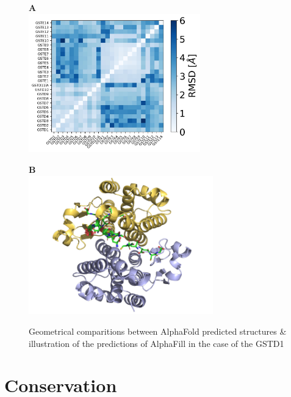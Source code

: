 \begin{figure}[H]
	\label{AlphaFill & GSHs}
	\begin{minipage}{.48\linewidth}
		\textbf{A}\\
		\includegraphics[height = 6cm]{figures/RMSD_matrix.jpg}
	\end{minipage}
	\begin{minipage}{.48\linewidth}
		\textbf{B}\\
		\includegraphics[height = 6cm]{figures/GSTD1_GSHs.png}
	\end{minipage}
	\caption{Geometrical comparitions between AlphaFold predicted structures \& illustration of the predictions of AlphaFill in the case of the GSTD1}
\end{figure}

\section{Conservation}

